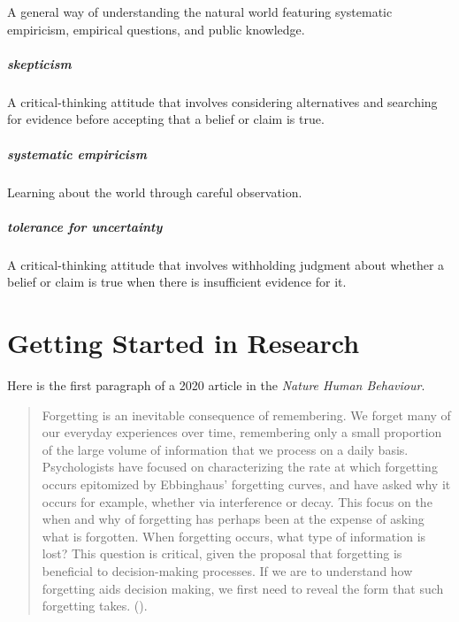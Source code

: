 \documentclass[
]{krantz}
\begin{document}
A general way of understanding the natural world featuring systematic empiricism, empirical questions, and public knowledge.

\paragraph*{skepticism}\label{skepticism}

A critical-thinking attitude that involves considering alternatives and searching for evidence before accepting that a belief or claim is true.

\paragraph*{systematic empiricism}\label{systematic-empiricism}

Learning about the world through careful observation.

\paragraph*{tolerance for uncertainty}\label{tolerance-for-uncertainty}

A critical-thinking attitude that involves withholding judgment about whether a belief or claim is true when there is insufficient evidence for it.

\chapter{Getting Started in Research}\label{getting-started-in-research}

Here is the first paragraph of a 2020 article in the \emph{Nature Human Behaviour}.

\begin{quote}
Forgetting is an inevitable consequence of remembering. We forget many of our everyday experiences over time, remembering only a small proportion of the large volume of information that we process on a daily basis. Psychologists have focused on characterizing the rate at which forgetting occurs epitomized by Ebbinghaus' forgetting curves, and have asked why it occurs for example, whether via interference or decay. This focus on the when and why of forgetting has perhaps been at the expense of asking what is forgotten. When forgetting occurs, what type of information is lost? This question is critical, given the proposal that forgetting is beneficial to decision-making processes. If we are to understand how forgetting aids decision making, we first need to reveal the form that such forgetting takes. ().
\end{quote}
\end{document}
